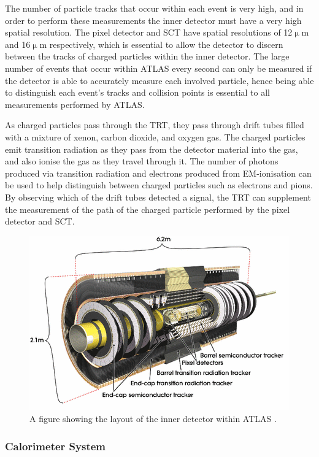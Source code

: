\documentclass[12pt,a4paper,epsf,portrait,times,epsfig]{article}
\begin{document}
		The number of particle tracks that occur within each event is very high, and in order to perform these measurements the inner detector must have a very high spatial resolution. The pixel detector and SCT have spatial resolutions of 12$\upmu$m and 16$\upmu$m respectively, which is	essential to allow the detector to discern between the tracks of charged particles within the
		inner detector. The large number of events that occur within ATLAS every second can only be measured if the detector is able to accurately measure each involved particle, hence being	able to distinguish each event’s tracks and collision points is essential to all measurements
		performed by ATLAS. \par
		
		As charged particles pass through the TRT, they pass through drift tubes filled with a mixture of xenon, carbon dioxide, and oxygen gas. The charged particles emit transition radiation as they pass from the detector material into the gas, and also ionise the gas as they travel through it. The number of photons produced via transition radiation and
		electrons produced from EM-ionisation can be used to help distinguish between charged	particles such as electrons and pions. By observing which of the drift tubes detected a	signal, the TRT can supplement the measurement of the path of the charged particle	performed by the pixel detector and SCT. \par
		
		
		\begin{figure}
			\centering
			\includegraphics[scale=0.7]{Inner_Detector}
			\caption{A figure showing the layout of the inner detector within ATLAS \cite{Article:ATLASDesignPaper}. }
			\label{Fig:InnerDetector}
		\end{figure}
		
		\subsubsection{Calorimeter System}
		
\end{document}
